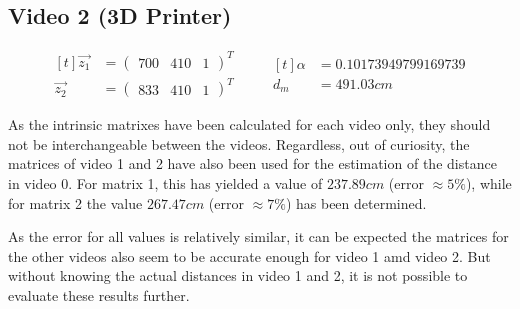 \subsection*{Video 2 (3D Printer)}

\begin{equation} \label{eq:video2}
    \begin{aligned}[t]
        \vec{z_1} &= \begin{pmatrix} 700 & 410 & 1 \end{pmatrix}^T \\
        \vec{z_2} &= \begin{pmatrix} 833 & 410 & 1 \end{pmatrix}^T
    \end{aligned}
    \qquad 
    \begin{aligned}[t]
        \alpha &= 0.10173949799169739\\
        d_m &= 491.03 cm
    \end{aligned}
\end{equation}

As the intrinsic matrixes have been calculated for each video only, they should not be interchangeable between the videos. Regardless, out of curiosity, the matrices of video 1 and 2 have also been used for the estimation of the distance in video 0. For matrix 1, this has yielded a value of $237.89cm$ (error $\approx5 \%$), while for matrix 2 the value $267.47cm$ (error $\approx7 \%$) has been determined.

As the error for all values is relatively similar, it can be expected the matrices for the other videos also seem to be accurate enough for video 1 amd video 2. But without knowing the actual distances in video 1 and 2, it is not possible to evaluate these results further.
